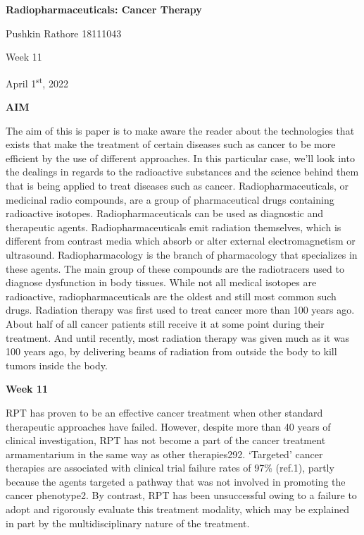 \documentclass[
]{article}
\author{}
\date{}
\begin{document}
\textbf{{Radiopharmaceuticals: Cancer Therapy}}

Pushkin Rathore 18111043

Week 11

April 1\textsuperscript{st}, 2022

\textbf{AIM}

The aim of this is paper is to make aware the reader about the
technologies that exists that make the treatment of certain diseases
such as cancer to be more efficient by the use of different approaches.
In this particular case, we'll look into the dealings in regards to the
radioactive substances and the science behind them that is being applied
to treat diseases such as cancer. Radiopharmaceuticals, or medicinal
radio compounds, are a group of pharmaceutical drugs containing
radioactive isotopes. Radiopharmaceuticals can be used as diagnostic and
therapeutic agents. Radiopharmaceuticals emit radiation themselves,
which is different from contrast media which absorb or alter external
electromagnetism or ultrasound. Radiopharmacology is the branch of
pharmacology that specializes in these agents. The main group of these
compounds are the radiotracers used to diagnose dysfunction in body
tissues. While not all medical isotopes are radioactive,
radiopharmaceuticals are the oldest and still most common such drugs.
Radiation therapy was first used to treat cancer more than 100 years
ago. About half of all cancer patients still receive it at some point
during their treatment. And until recently, most radiation therapy was
given much as it was 100 years ago, by delivering beams of radiation
from outside the body to kill tumors inside the body.

\textbf{Week 11}

RPT has proven to be an effective cancer treatment when other standard
therapeutic approaches have failed. However, despite more than 40 years
of clinical investigation, RPT has not become a part of the cancer
treatment armamentarium in the same way as other therapies292.
`Targeted' cancer therapies are associated with clinical trial failure
rates of 97\% (ref.1), partly because the agents targeted a pathway that
was not involved in promoting the cancer phenotype2. By contrast, RPT
has been unsuccessful owing to a failure to adopt and rigorously
evaluate this treatment modality, which may be explained in part by the
multidisciplinary nature of the treatment.
\end{document}

